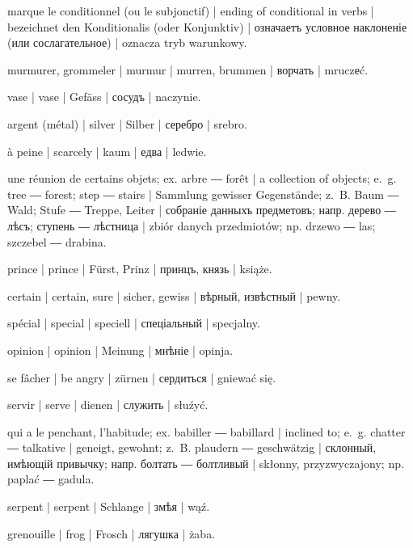 \begin{ekzvocab}{1em}
 marque le conditionnel (ou le subjonctif) | ending of conditional in verbs | bezeichnet den Konditionalis (oder Konjunktiv) | означаетъ условное наклоненіе (или сослагательное) | oznacza tryb warunkowy.

 murmurer, grommeler | murmur | murren, brummen | ворчать | mruczеć.

 vase | vase | Gefäss | сосудъ | naczynie.

 argent (métal) | silver | Silber | серебро | srebro.

 à peine | scarcely | kaum | едва | ledwie.

 une réunion de certains objets; ex.  arbre ―  forêt | a collection of objects; e.~g.  tree ―  forest;  step ―  stairs | Sammlung gewisser Gegenstände; z.~B.  Baum ―  Wald;  Stufe ―  Treppe, Leiter | собраніе данныхъ предметовъ; напр.  дерево ―  лѣсъ;  ступень ―  лѣстница | zbiór danych przedmiotów; np.  drzewo ―  las;  szczebel ―  drabina.

 prince | prince | Fürst, Prinz | принцъ, князь | książe.

 certain | certain, sure | sicher, gewiss | вѣрный, извѣстный | pewny.

 spécial | special | speciell | спеціальный | specjalny.

 opinion | opinion | Meinung | мнѣніе | opinja.

 se fâcher | be angry | zürnen | сердиться | gniewać się.

 servir | serve | dienen | служить | słuźyć.

 qui a le penchant, l’habitude; ex.  babiller ―  babillard | inclined to; e.~g.  chatter ―  talkative | geneigt, gewohnt; z.~B.  plaudern ―  geschwätzig | склонный, имѣющій привычку; напр.  болтать ―  болтливый | skłonny, przyzwyczajony; np.  paplać ―  gadula.

 serpent | serpent | Schlange | змѣя | wąź.

 grenouille | frog | Frosch | лягушка | żaba.

\end{ekzvocab}

